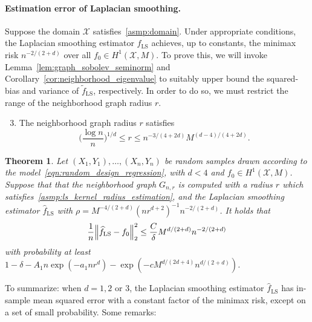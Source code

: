 \documentclass{article}
\newcommand{\1}{\mathbf{1}}
\newcommand{\Xset}{\mathcal{X}}
\newcommand{\wt}[1]{\widetilde{#1}}
\newcommand{\wh}[1]{\widehat{#1}}
\newcommand{\LS}{\mathrm{LS}}
\theoremstyle{alden}
\theoremstyle{aldenthm}
\newtheorem{theorem}{Theorem}
\theoremstyle{definition}
\theoremstyle{remark}
\begin{document}
\paragraph{Estimation error of Laplacian smoothing.} 
Suppose the domain $\Xset$ satisfies~\ref{asmp:domain}. Under appropriate conditions, the Laplacian smoothing estimator $\wh{f}_{\LS}$ achieves, up to constants, the minimax risk $n^{-2/(2 + d)}$ over all $f_0 \in H^1(\Xset,M)$. To prove this, we will invoke Lemma~\ref{lem:graph_sobolev_seminorm} and Corollary~\ref{cor:neighborhood_eigenvalue} to suitably upper bound the squared-bias and variance of $\wt{f}_{\LS}$, respectively. In order to do so, we must restrict the range of the neighborhood graph radius $r$. 
\begin{enumerate}[label=(R\arabic*)]
	\setcounter{enumi}{2}
	\item 
	\label{asmp:ls_kernel_radius_estimation}
	The neighborhood graph radius $r$ satisfies
	\begin{equation*}
	\biggl(\frac{\log n}{n}\biggr)^{1/d} \leq r \leq n^{-3/(4 + 2d)} M^{(d - 4)/(4 + 2d)}.
	\end{equation*}
\end{enumerate}
\begin{theorem}
	\label{thm:laplacian_smoothing_estimation1}
	Let $(X_1,Y_1),\ldots,(X_n,Y_n)$ be random samples drawn according to the model~\eqref{eqn:random_design_regression}, with $d < 4$ and $f_0 \in H^1(\Xset,M)$. Suppose that that the neighborhood graph $G_{n,r}$ is computed with a radius $r$ which satisfies~\ref{asmp:ls_kernel_radius_estimation},  and the Laplacian smoothing estimator $\wh{f}_{\LS}$ with $\rho = M^{-4/(2 + d)} (nr^{d + 2})^{-1} n^{-2/(2 + d)}$. It holds that
	\begin{equation*}
	\frac{1}{n}\Bigl\|\wh{f}_{\LS} - f_0\Bigr\|_2^2 \leq \frac{C}{\delta} M^{d/(2 + d)} n^{-2/(2 + d)}
	\end{equation*}
	with probability at least $1 - \delta -  A_1n\exp(-a_1nr^d) - \exp(-c M^{d/(2d + 4)} n^{d/(2+d)})$.
\end{theorem}
To summarize: when $d = 1,2$ or $3$, the Laplacian smoothing estimator $\wh{f}_{\LS}$ has in-sample mean squared error with a constant factor of the minimax risk, except on a set of small probability. Some remarks:
\end{document}
